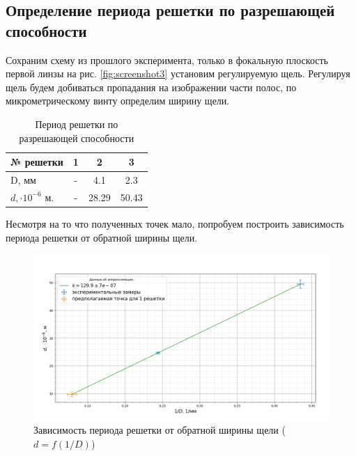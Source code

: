 \documentclass[a4paper, 12pt]{article}%
\begin{document}
	\subsection{Определение периода решетки по разрешающей способности}
	Сохраним схему из прошлого эксперимента, только в фокальную плоскость первой линзы на рис. \ref{fig:screenshot3} установим регулируемую щель. Регулируя щель будем добиваться пропадания на изображении части полос, по микрометрическому винту определим ширину щели.
	\begin{table}[H]
		\centering
		\begin{tabular}{|l|c|c|c|}
			\hline
			№ решетки & 1 & 2     & 3     \\ \hline
			D, мм & - & 4.1   & 2.3   \\ \hline
			$d, \cdot 10^{-6}$ м. & - & 28.29 & 50.43 \\ \hline
		\end{tabular}
		\caption{Период решетки по разрешающей способности}
	\end{table}
	Несмотря на то что полученных точек мало, попробуем построить зависимость периода решетки от обратной ширины щели.
	\begin{figure}[H]
		\centering
		\includegraphics[width=0.8\linewidth]{зависимость}
		\caption{Зависимость периода решетки от обратной ширины щели ($d = f(1/D)$)}
		\label{fig:}
	\end{figure}
\end{document}
